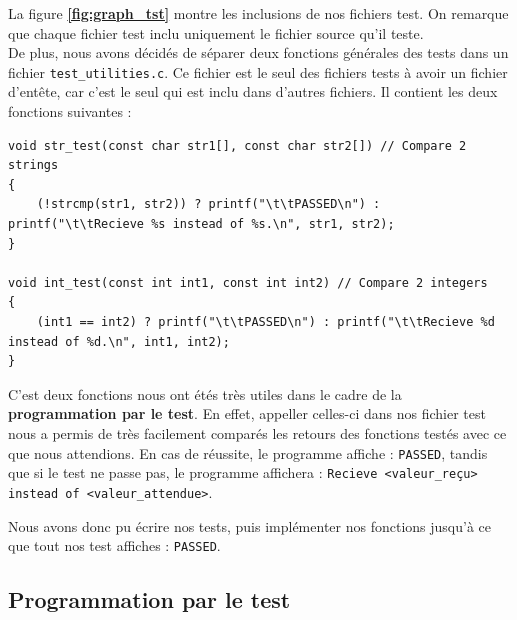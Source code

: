         La figure \textbf{\ref{fig:graph_tst}} montre les inclusions de nos fichiers test. On remarque que chaque fichier test inclu uniquement le fichier source qu'il teste. \\
        
        De plus, nous avons décidés de séparer deux fonctions générales des tests dans un fichier \texttt{test\_utilities.c}. Ce fichier est le seul des fichiers tests à avoir un fichier d'entête, car c'est le seul qui est inclu dans d'autres fichiers. Il contient les deux fonctions suivantes :

        \begin{lstlisting}
void str_test(const char str1[], const char str2[]) // Compare 2 strings
{ 
    (!strcmp(str1, str2)) ? printf("\t\tPASSED\n") : printf("\t\tRecieve %s instead of %s.\n", str1, str2);
}

void int_test(const int int1, const int int2) // Compare 2 integers
{
    (int1 == int2) ? printf("\t\tPASSED\n") : printf("\t\tRecieve %d instead of %d.\n", int1, int2);
}\end{lstlisting}

        C'est deux fonctions nous ont étés très utiles dans le cadre de la \textbf{programmation par le test}. En effet, appeller celles-ci dans nos fichier test nous a permis de très facilement comparés les retours des fonctions testés avec ce que nous attendions. En cas de réussite, le programme affiche : \texttt{PASSED}, tandis que si le test ne passe pas, le programme affichera : \texttt{Recieve <valeur\_reçu> instead of <valeur\_attendue>}.

        Nous avons donc pu écrire nos tests, puis implémenter nos fonctions jusqu'à ce que tout nos test affiches : \texttt{PASSED}.
        
    \subsection{Programmation par le test}

        
    